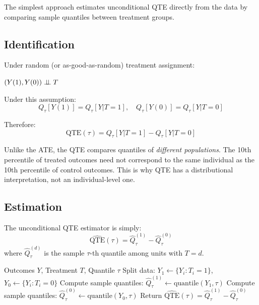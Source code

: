 The simplest approach estimates unconditional QTE directly from the data by comparing sample quantiles between treatment groups.

\subsection{Identification}

Under random (or as-good-as-random) treatment assignment:

\begin{assumption}
\label{assump:qte-unconf}
$(Y(1), Y(0)) \perp\!\!\!\perp T$
\end{assumption}

Under this assumption:
\[
Q_\tau[Y(1)] = Q_\tau[Y | T = 1], \quad Q_\tau[Y(0)] = Q_\tau[Y | T = 0]
\]

Therefore:
\[
\text{QTE}(\tau) = Q_\tau[Y | T = 1] - Q_\tau[Y | T = 0]
\]

\begin{remark}
Unlike the ATE, the QTE compares quantiles of \emph{different populations}. The 10th percentile of treated outcomes need not correspond to the same individual as the 10th percentile of control outcomes. This is why QTE has a distributional interpretation, not an individual-level one.
\end{remark}

\subsection{Estimation}

The unconditional QTE estimator is simply:
\[
\widehat{\text{QTE}}(\tau) = \hat{Q}_\tau^{(1)} - \hat{Q}_\tau^{(0)}
\]
where $\hat{Q}_\tau^{(d)}$ is the sample $\tau$-th quantile among units with $T = d$.

\begin{algorithm}[H]
\caption{Unconditional QTE Estimation}
\label{alg:unconditional-qte}
\begin{algorithmic}[1]
\REQUIRE Outcomes $Y$, Treatment $T$, Quantile $\tau$
\STATE Split data: $Y_1 \gets \{Y_i : T_i = 1\}$, $Y_0 \gets \{Y_i : T_i = 0\}$
\STATE Compute sample quantiles: $\hat{Q}_\tau^{(1)} \gets \text{quantile}(Y_1, \tau)$
\STATE Compute sample quantiles: $\hat{Q}_\tau^{(0)} \gets \text{quantile}(Y_0, \tau)$
\STATE Return $\widehat{\text{QTE}}(\tau) = \hat{Q}_\tau^{(1)} - \hat{Q}_\tau^{(0)}$
\end{algorithmic}
\end{algorithm}

